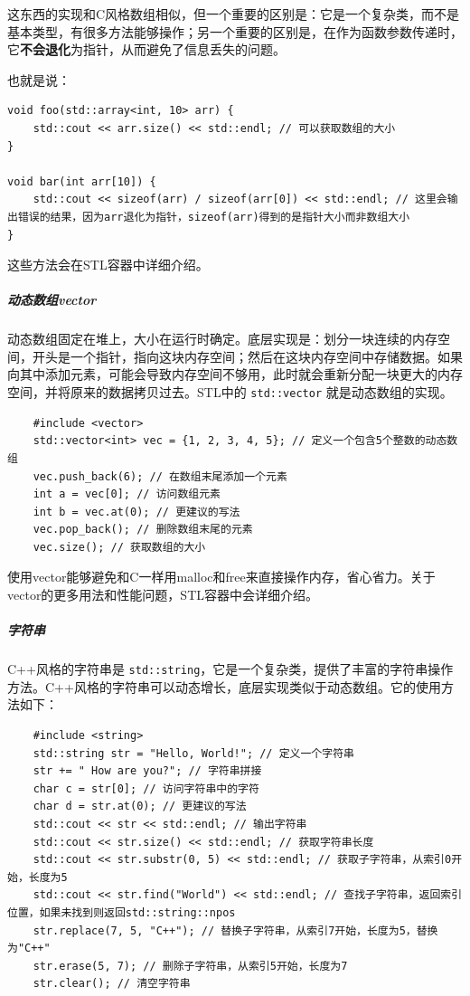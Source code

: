 这东西的实现和C风格数组相似，但一个重要的区别是：它是一个复杂类，而不是基本类型，有很多方法能够操作；另一个重要的区别是，在作为函数参数传递时，它\textbf{不会退化}为指针，从而避免了信息丢失的问题。

也就是说：
\begin{verbatim}
void foo(std::array<int, 10> arr) {
    std::cout << arr.size() << std::endl; // 可以获取数组的大小
}

void bar(int arr[10]) {
    std::cout << sizeof(arr) / sizeof(arr[0]) << std::endl; // 这里会输出错误的结果，因为arr退化为指针，sizeof(arr)得到的是指针大小而非数组大小
}
\end{verbatim}
这些方法会在STL容器中详细介绍。

\subparagraph{动态数组vector} 动态数组固定在堆上，大小在运行时确定。底层实现是：划分一块连续的内存空间，开头是一个指针，指向这块内存空间；然后在这块内存空间中存储数据。如果向其中添加元素，可能会导致内存空间不够用，此时就会重新分配一块更大的内存空间，并将原来的数据拷贝过去。STL中的 \verb|std::vector| 就是动态数组的实现。
\begin{verbatim}
    #include <vector>
    std::vector<int> vec = {1, 2, 3, 4, 5}; // 定义一个包含5个整数的动态数组
    vec.push_back(6); // 在数组末尾添加一个元素
    int a = vec[0]; // 访问数组元素
    int b = vec.at(0); // 更建议的写法
    vec.pop_back(); // 删除数组末尾的元素
    vec.size(); // 获取数组的大小
\end{verbatim}
使用vector能够避免和C一样用malloc和free来直接操作内存，省心省力。关于vector的更多用法和性能问题，STL容器中会详细介绍。

\subparagraph{字符串} C++风格的字符串是 \verb|std::string|，它是一个复杂类，提供了丰富的字符串操作方法。C++风格的字符串可以动态增长，底层实现类似于动态数组。它的使用方法如下：
\begin{verbatim}
    #include <string>
    std::string str = "Hello, World!"; // 定义一个字符串
    str += " How are you?"; // 字符串拼接
    char c = str[0]; // 访问字符串中的字符
    char d = str.at(0); // 更建议的写法
    std::cout << str << std::endl; // 输出字符串
    std::cout << str.size() << std::endl; // 获取字符串长度
    std::cout << str.substr(0, 5) << std::endl; // 获取子字符串，从索引0开始，长度为5
    std::cout << str.find("World") << std::endl; // 查找子字符串，返回索引位置，如果未找到则返回std::string::npos
    str.replace(7, 5, "C++"); // 替换子字符串，从索引7开始，长度为5，替换为"C++"
    str.erase(5, 7); // 删除子字符串，从索引5开始，长度为7
    str.clear(); // 清空字符串
\end{verbatim}

